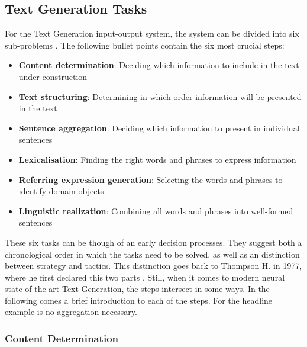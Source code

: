 \subsection{Text Generation Tasks}

For the Text Generation input-output system, the system can be divided into six sub-problems \cite{reiter}. The following bullet points contain the six most crucial steps:

\begin{itemize}
	\item \textbf{Content determination}: Deciding which information to include in the text under construction
	\item \textbf{Text structuring}: Determining in which order information will be presented in the text
	\item \textbf{Sentence aggregation}: Deciding which information to present in individual sentences
	\item \textbf{Lexicalisation}: Finding the right words and phrases to express information
	\item \textbf{Referring expression generation}: Selecting the words and phrases to identify domain objects
	\item \textbf{Linguistic realization}: Combining all words and phrases into well-formed sentences
\end{itemize}

These six tasks can be though of an early decision processes. They suggest both a chronological order in which the tasks need to be solved, as well as an distinction between strategy and tactics. This distinction goes back to Thompson H. in 1977, where he first declared this two parts \cite{thompson}. Still, when it comes to modern neural state of the art Text Generation, the steps intersect in some ways. In the following comes a brief introduction to each of the steps. For the headline example is no aggregation necessary.

\subsubsection{Content Determination}

